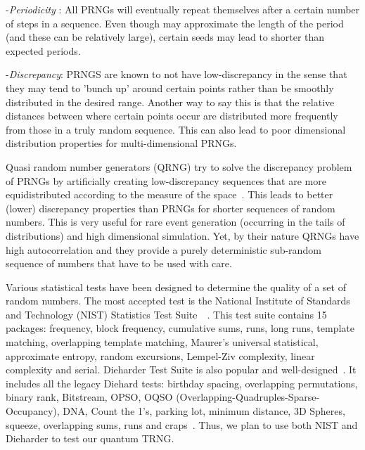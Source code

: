 \documentclass{article}
\begin{document}
-\textit{Periodicity} : All PRNGs will eventually repeat themselves after a certain number of steps
in a sequence. Even though may approximate the length of the period (and these can be
relatively large), certain seeds may lead to shorter than expected periods.

-\textit{Discrepancy}: PRNGS are known to not have low-discrepancy in the sense that they may
tend to 'bunch up' around certain points rather than be smoothly distributed in the desired
range. Another way to say this is that the relative distances between where certain points
occur are distributed more frequently from those in a truly random sequence. This can also
lead to poor dimensional distribution properties for multi-dimensional PRNGs.

Quasi random number generators (QRNG) try to solve the discrepancy problem of PRNGs
by artificially creating low-discrepancy sequences that are more equidistributed according to
the measure of the space~\citep{joy1996quasi}. This leads to better (lower) discrepancy properties than PRNGs for
shorter sequences of random numbers. This is very useful for rare event generation (occurring
in the tails of distributions) and high dimensional simulation. Yet, by their nature QRNGs
have high autocorrelation and they provide a purely deterministic sub-random sequence of
numbers that have to be used with care.

    Various statistical tests have been designed to determine the quality of a set of random numbers. The most accepted test is the National Institute of Standards and Technology (NIST) Statistics Test Suite~\citep{soto1999statistical}~\citep{rukhinnist}. This test suite contains 15 packages: frequency, block frequency, cumulative sums, runs, long runs, template matching, overlapping template matching, Maurer's universal statistical, approximate entropy, random excursions, Lempel-Ziv complexity, linear complexity and serial.
    Dieharder Test Suite is also popular and well-designed~\citep{brown2013dieharder}. It includes all the legacy Diehard tests: birthday spacing, overlapping permutations, binary rank, Bitstream, OPSO, OQSO (Overlapping-Quadruples-Sparse-Occupancy), DNA, Count the 1’s, parking lot, minimum distance, 3D Spheres, squeeze, overlapping sums, runs and craps~\citep{marsaglia2008marsaglia}.
    Thus, we plan to use both  NIST and Dieharder to test our quantum TRNG.
\end{document}
